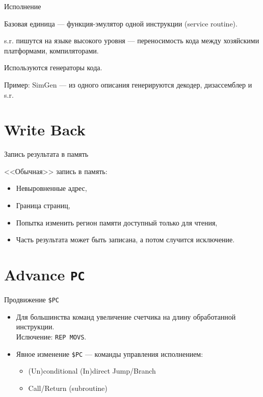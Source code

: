 \begin{frame}{Исполнение}

Базовая единица --- функция-эмулятор одной инструкции (service routine).

\bigskip

s.r. пишутся на языке высокого уровня --- переносимость кода между хозяйскими
платформами, компиляторами.

\bigskip

Используются генераторы кода.

Пример: SimGen --- из одного описания генерируются декодер, дизассемблер и s.r.

\end{frame}

\section{Write Back}

\begin{frame}{Запись результата в память}

<<Обычная>> запись в память:

\pause

\begin{itemize}
    \item Невыровненные адрес,
    \item Граница страниц,
    \item Попытка изменить регион памяти доступный только для чтения,
    \item Часть результата может быть записана, а потом случится исключение.
\end{itemize}

\end{frame}

\section{Advance \texttt{PC}}

\begin{frame}{Продвижение \texttt{\$PC}}

\begin{itemize}
    \item Для большинства команд увеличение счетчика на длину обработанной инструкции. \\
    Ислючение: \texttt{REP MOVS}.
    \bigskip
    \item Явное изменение \texttt{\$PC} --- команды управления исполнением:
    \begin{itemize}
        \item (Un)conditional (In)direct Jump/Branch
        \item Call/Return (subroutine)
    \end{itemize}
\end{itemize}

\end{frame}

